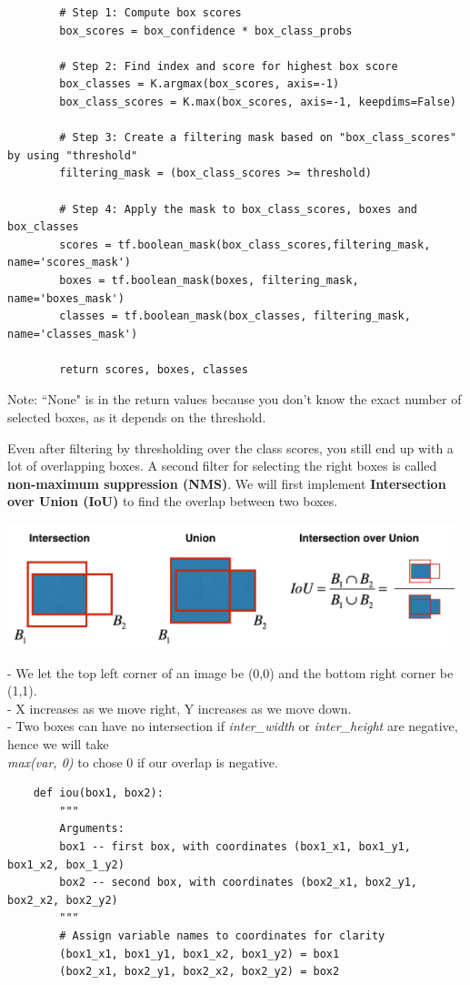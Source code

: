 \documentclass[11pt, a4paper]{article}
\begin{document}
\begin{spacing}{1.1}
\begin{lstlisting}
		# Step 1: Compute box scores
		box_scores = box_confidence * box_class_probs
		
		# Step 2: Find index and score for highest box score
		box_classes = K.argmax(box_scores, axis=-1)
		box_class_scores = K.max(box_scores, axis=-1, keepdims=False)
		
		# Step 3: Create a filtering mask based on "box_class_scores" by using "threshold"
		filtering_mask = (box_class_scores >= threshold)
		
		# Step 4: Apply the mask to box_class_scores, boxes and box_classes
		scores = tf.boolean_mask(box_class_scores,filtering_mask, name='scores_mask')
		boxes = tf.boolean_mask(boxes, filtering_mask, name='boxes_mask')
		classes = tf.boolean_mask(box_classes, filtering_mask, name='classes_mask')
		
		return scores, boxes, classes \end{lstlisting} \vspace*{1mm}
		Note: ``None" is in the return values because you don't know the exact number of selected boxes, as it depends on the threshold. \newpage

	\noindent Even after filtering by thresholding over the class scores, you still end up with a lot of overlapping boxes. A second filter for selecting the right boxes is called \textbf{non-maximum suppression (NMS)}. We will first implement \textbf{Intersection over Union (IoU)} to find the overlap between two boxes.
	\begin{center}	\includegraphics[scale=.75]{iou}	\end{center}
	- We let the top left corner of an image be (0,0) and the bottom right corner be (1,1). \\
	- X increases as we move right, Y increases as we move down. \\
	- Two boxes can have no intersection if \textit{inter\_width} or \textit{inter\_height} are negative, hence we will take \\
	\hspace*{2mm} \textit{max(var, 0)} to chose 0 if our overlap is negative.
	\begin{lstlisting}
	def iou(box1, box2):
		"""		
		Arguments:
		box1 -- first box, with coordinates (box1_x1, box1_y1, box1_x2, box_1_y2)
		box2 -- second box, with coordinates (box2_x1, box2_y1, box2_x2, box2_y2)
		"""
		# Assign variable names to coordinates for clarity
		(box1_x1, box1_y1, box1_x2, box1_y2) = box1
		(box2_x1, box2_y1, box2_x2, box2_y2) = box2
		

\end{lstlisting}
\end{spacing}
\end{document}
